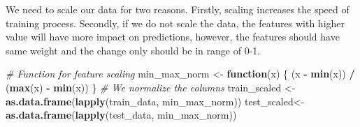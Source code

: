 \documentclass[
]{article}
\newenvironment{Shaded}{\begin{snugshade}}{\end{snugshade}}
\newcommand{\AttributeTok}[1]{\textcolor[rgb]{0.13,0.29,0.53}{#1}}
\newcommand{\CommentTok}[1]{\textcolor[rgb]{0.56,0.35,0.01}{\textit{#1}}}
\newcommand{\ControlFlowTok}[1]{\textcolor[rgb]{0.13,0.29,0.53}{\textbf{#1}}}
\newcommand{\DecValTok}[1]{\textcolor[rgb]{0.00,0.00,0.81}{#1}}
\newcommand{\FunctionTok}[1]{\textcolor[rgb]{0.13,0.29,0.53}{\textbf{#1}}}
\newcommand{\NormalTok}[1]{#1}
\newcommand{\OtherTok}[1]{\textcolor[rgb]{0.56,0.35,0.01}{#1}}
\newcommand{\SpecialCharTok}[1]{\textcolor[rgb]{0.81,0.36,0.00}{\textbf{#1}}}
\newcommand{\StringTok}[1]{\textcolor[rgb]{0.31,0.60,0.02}{#1}}
\begin{document}
We need to scale our data for two reasons. Firstly, scaling increases
the speed of training process. Secondly, if we do not scale the data,
the features with higher value will have more impact on predictions,
however, the features should have same weight and the change only should
be in range of 0-1.

\begin{Shaded}
\begin{Highlighting}[]
\CommentTok{\# Function for feature scaling}
\NormalTok{min\_max\_norm }\OtherTok{\textless{}{-}} \ControlFlowTok{function}\NormalTok{(x) \{}
\NormalTok{(x }\SpecialCharTok{{-}} \FunctionTok{min}\NormalTok{(x)) }\SpecialCharTok{/}\NormalTok{ (}\FunctionTok{max}\NormalTok{(x) }\SpecialCharTok{{-}} \FunctionTok{min}\NormalTok{(x))}
\NormalTok{\}}
\CommentTok{\# We normalize the columns}
\NormalTok{train\_scaled }\OtherTok{\textless{}{-}} \FunctionTok{as.data.frame}\NormalTok{(}\FunctionTok{lapply}\NormalTok{(train\_data, min\_max\_norm))}
\NormalTok{test\_scaled}\OtherTok{\textless{}{-}} \FunctionTok{as.data.frame}\NormalTok{(}\FunctionTok{lapply}\NormalTok{(test\_data, min\_max\_norm))}
\end{Highlighting}
\end{Shaded}

\begin{Shaded}
\end{Shaded}
\end{document}
